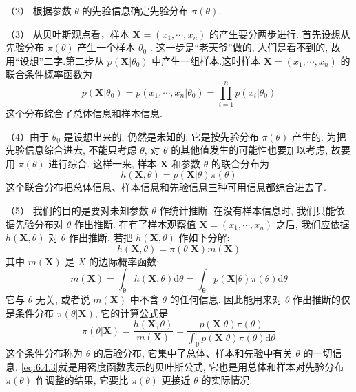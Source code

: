   （2） 根据参数 $\theta$ 的先验信息确定{\heiti 先验分布} $\pi(\theta)$.

  （3） 从贝叶斯观点看，样本 $\boldsymbol{X}=\left(x_{1}, \cdots, x_{n}\right)$ 的产生要分两步进行. 首先设想从先验分布 $\pi(\theta)$ 产生一个样本 $\theta_0$ . 这一步是“老天爷”做的, 人们是看不到的, 故用“设想”二字.第二步从 $p\left(\boldsymbol{X} | \theta_{0}\right)$ 中产生一组样本.这时样本 $\boldsymbol{X}=\left(x_{1}, \cdots, x_{n}\right)$ 的{\heiti 联合条件概率函数}为
\[p\left(\boldsymbol{X} | \theta_{0}\right)=p\left(x_{1}, \cdots, x_{n} | \theta_{0}\right)=\prod_{i=1}^{n} p\left(x_{i} | \theta_{0}\right)\]
这个分布综合了总体信息和样本信息.

   （4）由于 $\theta_0$ 是设想出来的, 仍然是未知的, 它是按先验分布 $\pi(\theta)$ 产生的.
为把先验信息综合进去, 不能只考虑 $\theta$, 对 $\theta$ 的其他值发生的可能性也要加以考虑, 故要用 $\pi(\theta)$ 进行综合. 这样一来, 样本 $\boldsymbol{X}$ 和参数 $\theta$ 的{\heiti 联合分布}为
\[h(\boldsymbol{X}, \theta)=p(\boldsymbol{X}|\theta) \pi(\theta)\]
这个联合分布把总体信息、样本信息和先验信息三种可用信息都综合进去了.

  （5） 我们的目的是要对未知参数 $\theta$ 作统计推断. 在没有样本信息时, 我们只能依据先验分布对 $\theta$ 作出推断. 在有了样本观察值 $\boldsymbol{X}=\left(x_{1}, \cdots, x_{n}\right)$ 之后, 我们应依据 $h(\boldsymbol{X}, \theta)$ 对 $\theta$ 作出推断. 若把 $h(\mathbf{X}, \theta)$ 作如下分解:
\[h(\boldsymbol{X}, \theta)=\pi(\theta | \boldsymbol{X}) m(\boldsymbol{X})\]
其中 $m(\boldsymbol{X})$ 是 $X$ 的边际概率函数:
\begin{equation}\label{eq:6.4.2}
m(\boldsymbol{X})=\int_{\boldsymbol{\theta}} h(\boldsymbol{X}, \theta) \mathrm{d} \theta=\int_{\boldsymbol{\theta}} p(\boldsymbol{X}| \theta) \pi(\theta) \mathrm{d} \theta
\end{equation}
它与 $\theta$ 无关, 或者说 $m(\boldsymbol{X})$ 中不含 $\theta$ 的任何信息. 因此能用来对 $\theta$ 作出推断的仅是条件分布 $\pi(\theta | \mathbf{X})$, 它的计算公式是
\begin{equation}\label{eq:6.4.3}
\pi(\theta | \boldsymbol{X})=\frac{h(\boldsymbol{X}, \theta)}{m(\boldsymbol{X})}=\frac{p(\boldsymbol{X} | \theta) \pi(\theta)}{\int_{\boldsymbol{\theta}} p(\boldsymbol{X} | \theta) \pi(\theta) \mathrm{d} \theta}
\end{equation}
这个条件分布称为 $\theta$ 的后验分布, 它集中了总体、样本和先验中有关 $\theta$ 的一切信息. \eqref{eq:6.4.3}就是用密度函数表示的贝叶斯公式, 它也是用总体和样本对先验分布 $\pi(\theta)$ 作调整的结果, 它要比 $\pi(\theta)$ 更接近 $\theta$ 的实际情况.


